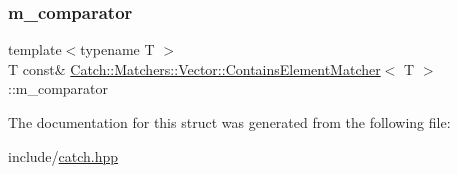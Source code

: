 \subsubsection{\texorpdfstring{m\+\_\+comparator}{m\_comparator}}
{\footnotesize\ttfamily template$<$typename T $>$ \\
T const\& \mbox{\hyperlink{structCatch_1_1Matchers_1_1Vector_1_1ContainsElementMatcher}{Catch\+::\+Matchers\+::\+Vector\+::\+Contains\+Element\+Matcher}}$<$ T $>$\+::m\+\_\+comparator}



The documentation for this struct was generated from the following file\+:\begin{DoxyCompactItemize}
\item 
include/\mbox{\hyperlink{catch_8hpp}{catch.\+hpp}}\end{DoxyCompactItemize}
